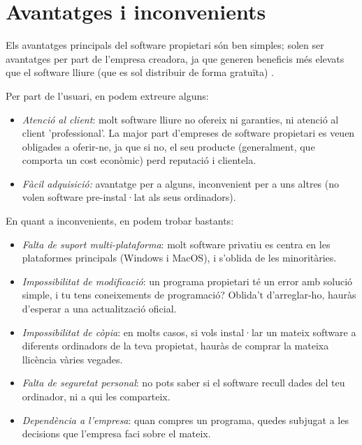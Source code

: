 \section{Avantatges i inconvenients}

Els avantatges principals del software propietari  són ben simples; solen ser avantatges per part
de l'empresa creadora, ja que generen beneficis més elevats que el software lliure (que es sol distribuir
de forma gratuïta) \cite{gentegeek}.

Per part de l'usuari, en podem extreure alguns:

\begin{itemize}
\item \emph{Atenció al client}: molt software lliure no ofereix ni garanties, ni atenció al client 'professional'.
La major part d'empreses de software propietari es veuen obligades a oferir-ne, ja que si no, el seu producte (generalment,
que comporta un cost econòmic) perd reputació i clientela.
\item \emph{Fàcil adquisició:} avantatge per a alguns, inconvenient per a uns altres (no volen software pre-instal·lat als seus
ordinadors).
\end{itemize}

En quant a inconvenients, en podem trobar bastants:
\begin{itemize}
\item \emph{Falta de suport multi-plataforma}: molt software privatiu es centra en les plataformes principals (Windows i MacOS),
i s'oblida de les minoritàries.
\item \emph{Impossibilitat de modificació}: un programa propietari té un error amb solució simple, i tu tens coneixements de
programació? Oblida't d'arreglar-ho, hauràs d'esperar a una actualització oficial.
\item \emph{Impossibilitat de còpia}: en molts casos, si vols instal·lar un mateix software a diferents ordinadors de la teva
propietat, hauràs de comprar la mateixa llicència vàries vegades.
\item \emph{Falta de seguretat personal}: no pots saber si el software recull dades del teu ordinador, ni a qui les comparteix.
\item \emph{Dependència a l'empresa}: quan compres un programa, quedes subjugat a les decisions que l'empresa faci sobre el mateix.
\end{itemize}

